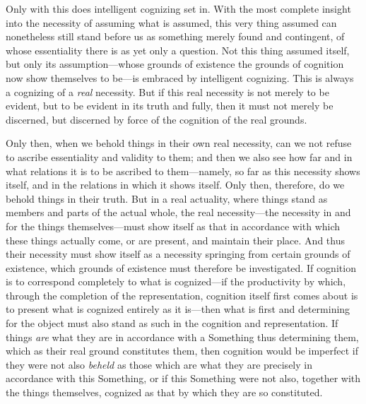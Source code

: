 \documentclass[12pt,a4paper]{book}
\begin{document}
Only with this does intelligent cognizing set in. With the most complete insight
into the necessity of assuming what is assumed, this very thing assumed can
nonetheless still stand before us as something merely found and contingent, of
whose essentiality there is as yet only a question. Not this thing assumed
itself, but only its assumption---whose grounds of existence the grounds of
cognition now show themselves to be---is embraced by intelligent cognizing. This
is always a cognizing of a \emph{real} necessity. But if this real necessity is
not merely to be evident, but to be evident in its truth and fully, then it must
not merely be discerned, but discerned by force of the cognition of the real
grounds.

Only then, when we behold things in their own real necessity, can we not refuse
to ascribe essentiality and validity to them; and then we also see how far and in
what relations it is to be ascribed to them---namely, so far as this necessity
shows itself, and in the relations in which it shows itself. Only then,
therefore, do we behold things in their truth. But in a real actuality, where
things stand as members and parts of the actual whole, the real necessity---the
necessity in and for the things themselves---must show itself as that in
accordance with which these things actually come, or are present, and maintain
their place. And thus their necessity must show itself as a necessity springing
from certain grounds of existence, which grounds of existence must therefore be
investigated. If cognition is to correspond completely to what is cognized---if
the productivity by which, through the completion of the representation, cognition
itself first comes about is to present what is cognized entirely as it is---then
what is first and determining for the object must also stand as such in the
cognition and representation. If things \emph{are} what they are in accordance with a
Something thus determining them, which as their real ground constitutes them, then
cognition would be imperfect if they were not also \emph{beheld} as those which are what
they are precisely in accordance with this Something, or if this Something were
not also, together with the things themselves, cognized as that by which they are
so constituted.
\end{document}

